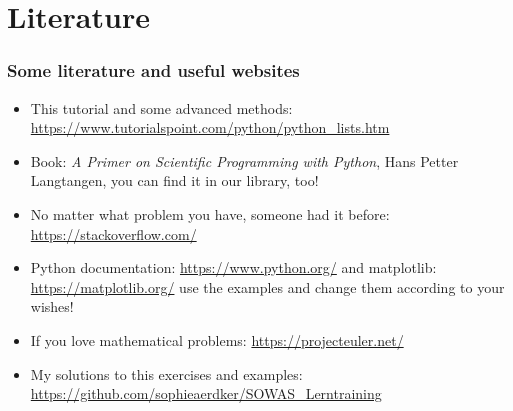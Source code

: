 \documentclass{beamer}
\begin{document}
\section{Literature}
\begin{frame}
\frametitle{Some literature and useful websites}
	\begin{itemize}
		\item This tutorial and some advanced methods: \url{https://www.tutorialspoint.com/python/python_lists.htm}
		\item Book: \textit{A Primer on Scientific Programming with Python}, Hans Petter Langtangen, you can find it in our library, too!
		\item No matter what problem you have, someone had it before: \url{https://stackoverflow.com/}
		\item Python documentation: \url{https://www.python.org/} and matplotlib: \url{https://matplotlib.org/} use the examples and change them according to your wishes!
		\item If you love mathematical problems: \url{https://projecteuler.net/}
		\item My solutions to this exercises and examples: \url{https://github.com/sophieaerdker/SOWAS_Lerntraining}
	\end{itemize}
\end{frame}
\end{document}

